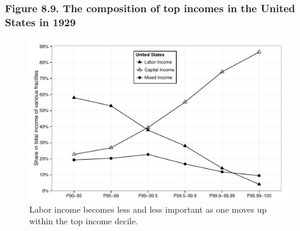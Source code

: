 \documentclass[t]{beamer}\usepackage[]{graphicx}\usepackage[]{color}
\newenvironment{knitrout}{}{} %
\begin{document}
\begin{frame}[label=Figure_8_9,fragile]
\frametitle{Figure 8.9. The composition of top incomes in the United States in 1929}
\begin{figure}[t]
\begin{minipage}[b]{\textwidth}
\centering
\begin{knitrout}\footnotesize
{}\color{fgcolor}

{\centering \includegraphics[width=1\linewidth]{figures/bw/Figure_8_9} 

}



\end{knitrout}
\caption{Labor income becomes less and less important as one moves up within the top income decile.}
\end{minipage}
\end{figure}
\end{frame}
\end{document}
